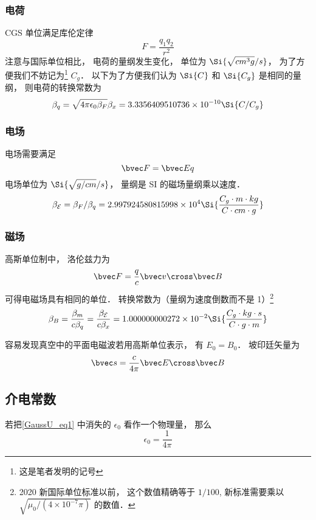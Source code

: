 
\begin{issues}
\issueDraft
\end{issues}


\subsubsection{电荷}
CGS 单位满足库伦定律
\begin{equation}\label{GaussU_eq1}
F = \frac{q_1 q_2}{r^2}
\end{equation}
注意与国际单位相比， 电荷的量纲发生变化， 单位为 $\Si{\sqrt{cm^3 g}/s}$， 为了方便我们不妨记为\footnote{这是笔者发明的记号} $C_g$． 以下为了方便我们认为 $\Si{C}$ 和 $\Si{C_g}$ 是相同的量纲， 则电荷的转换常数为
\begin{equation}
\beta_q = \sqrt{4\pi\epsilon_0\beta_F} \beta_x = 3.3356409510736\times 10^{-10} \Si{C/C_g}
\end{equation}

\subsubsection{电场}
电场需要满足
\begin{equation}
\bvec F = \bvec E q
\end{equation}
电场单位为 $\Si{\sqrt{g/cm}/s}$， 量纲是 SI 的磁场量纲乘以速度．
\begin{equation}
\beta_{\mathcal E} = \beta_F/\beta_q = 2.997924580815998\times 10^4 \Si{\frac{C_g\cdot m\cdot kg}{C\cdot cm\cdot g}}
\end{equation}

\subsubsection{磁场}
高斯单位制中， 洛伦兹力为
\begin{equation}
\bvec F = \frac{q}{c} \bvec v \cross \bvec B
\end{equation}
可得电磁场具有相同的单位． 转换常数为（量纲为速度倒数而不是 1）\footnote{2020 新国际单位标准以前， 这个数值精确等于 $1/100$, 新标准需要乘以 $\sqrt{\mu_0/(4\times 10^{-7}\pi)}$ 的数值．}
\begin{equation}
\beta_B = \frac{\beta_m}{c\beta_q} = \frac{\beta_{\mathcal E}}{c\beta_x} = 1.000000000272\times 10^{-2} \Si{\frac{C_g\cdot kg \cdot s}{C \cdot g \cdot m}}
\end{equation}

容易发现真空中的平面电磁波若用高斯单位表示， 有 $E_0 = B_0$． 坡印廷矢量为
\begin{equation}
\bvec s = \frac{c}{4\pi} \bvec E \cross \bvec B
\end{equation}

\subsection{介电常数}
若把\autoref{GaussU_eq1} 中消失的 $\epsilon_0$ 看作一个物理量， 那么
\begin{equation}
\epsilon_0 = \frac{1}{4\pi}
\end{equation}
